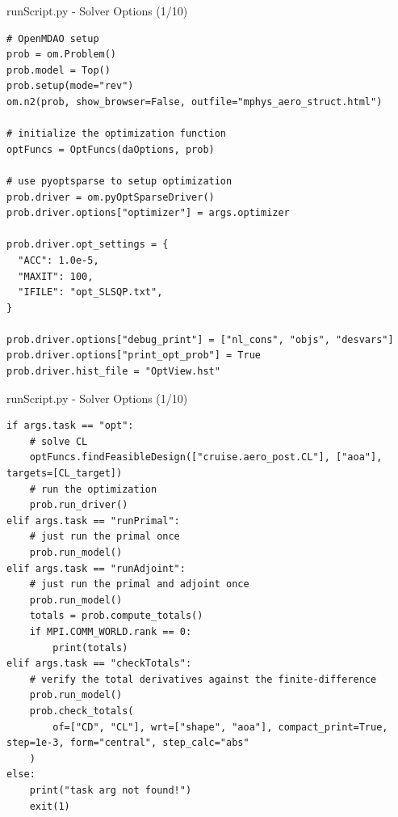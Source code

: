 \documentclass{bredelebeamer}
\begin{document}
\begin{frame}[fragile]{runScript.py - Solver Options (1/10)}
\scriptsize
\lstset{ language=bash }
\begin{lstlisting}
# OpenMDAO setup
prob = om.Problem()
prob.model = Top()
prob.setup(mode="rev")
om.n2(prob, show_browser=False, outfile="mphys_aero_struct.html")

# initialize the optimization function
optFuncs = OptFuncs(daOptions, prob)

# use pyoptsparse to setup optimization
prob.driver = om.pyOptSparseDriver()
prob.driver.options["optimizer"] = args.optimizer

prob.driver.opt_settings = {
  "ACC": 1.0e-5,
  "MAXIT": 100,
  "IFILE": "opt_SLSQP.txt",
}

prob.driver.options["debug_print"] = ["nl_cons", "objs", "desvars"]
prob.driver.options["print_opt_prob"] = True
prob.driver.hist_file = "OptView.hst"

\end{lstlisting}
\normalsize
\end{frame}

\begin{frame}[fragile]{runScript.py - Solver Options (1/10)}
\scriptsize
\lstset{ language=bash }
\begin{lstlisting}
if args.task == "opt":
    # solve CL
    optFuncs.findFeasibleDesign(["cruise.aero_post.CL"], ["aoa"], targets=[CL_target])
    # run the optimization
    prob.run_driver()
elif args.task == "runPrimal":
    # just run the primal once
    prob.run_model()
elif args.task == "runAdjoint":
    # just run the primal and adjoint once
    prob.run_model()
    totals = prob.compute_totals()
    if MPI.COMM_WORLD.rank == 0:
        print(totals)
elif args.task == "checkTotals":
    # verify the total derivatives against the finite-difference
    prob.run_model()
    prob.check_totals(
        of=["CD", "CL"], wrt=["shape", "aoa"], compact_print=True, step=1e-3, form="central", step_calc="abs"
    )
else:
    print("task arg not found!")
    exit(1)
\end{lstlisting}
\normalsize
\end{frame}
\end{document}
